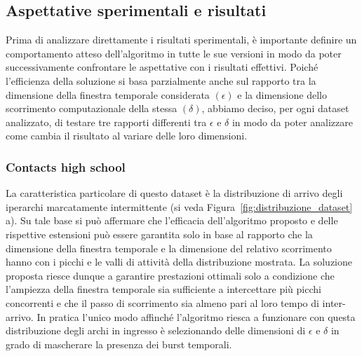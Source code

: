 \subsection{Aspettative sperimentali e risultati}

Prima di analizzare direttamente i risultati sperimentali, è importante definire un comportamento atteso dell'algoritmo in tutte le sue versioni in modo da poter successivamente confrontare le aspettative con i risultati effettivi.
Poiché l'efficienza della soluzione si basa parzialmente anche sul rapporto tra la dimensione della finestra temporale considerata $(\epsilon)$ e la dimensione dello scorrimento computazionale della stessa $(\delta)$, abbiamo deciso, per ogni dataset analizzato, di testare tre rapporti differenti tra $\epsilon$ e $\delta$ in modo da poter analizzare come cambia il risultato al variare delle loro dimensioni.

\subsubsection*{Contacts high school}

La caratteristica particolare di questo dataset è la distribuzione di arrivo degli iperarchi marcatamente intermittente (si veda Figura~\ref{fig:distribuzione_dataset} a).
Su tale base si può affermare che l'efficacia dell'algoritmo proposto e delle rispettive estensioni può essere garantita solo in base al rapporto che la dimensione della finestra temporale e la dimensione del relativo scorrimento hanno con i picchi e le valli di attività della distribuzione mostrata.
La soluzione proposta riesce dunque a garantire prestazioni ottimali solo a condizione che l'ampiezza della finestra temporale sia sufficiente a intercettare più picchi concorrenti e che il passo di scorrimento sia almeno pari al loro tempo di inter-arrivo.
In pratica l'unico modo affinché l'algoritmo riesca a funzionare con questa distribuzione degli archi in ingresso è selezionando delle dimensioni di $\epsilon$ e $\delta$ in grado di mascherare la presenza dei burst temporali.

